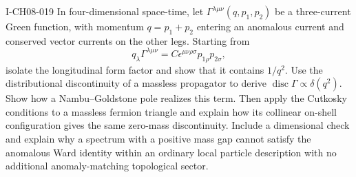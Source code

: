 \begin{exercise}{I-CH08-019}
In four-dimensional space-time, let $\Gamma^{\lambda\mu\nu}(q,p_1,p_2)$ be a three-current Green function,
with momentum $q=p_1+p_2$ entering an anomalous current and conserved vector
currents on the other legs.  Starting from
\[
 q_\lambda\Gamma^{\lambda\mu\nu}
 =C\epsilon^{\mu\nu\rho\sigma}p_{1\rho}p_{2\sigma},
\]
isolate the longitudinal form factor and show that it contains $1/q^2$.
Use the distributional discontinuity of a massless propagator to derive
$\operatorname{disc}\Gamma\propto\delta(q^2)$.  Show how a Nambu--Goldstone
pole realizes this term.  Then apply the Cutkosky conditions to a massless
fermion triangle and explain how its collinear on-shell configuration gives
the same zero-mass discontinuity.  Include a dimensional check and explain why
a spectrum with a positive mass gap cannot satisfy the anomalous Ward
identity within an ordinary local particle description with no additional
anomaly-matching topological sector.
\end{exercise}
